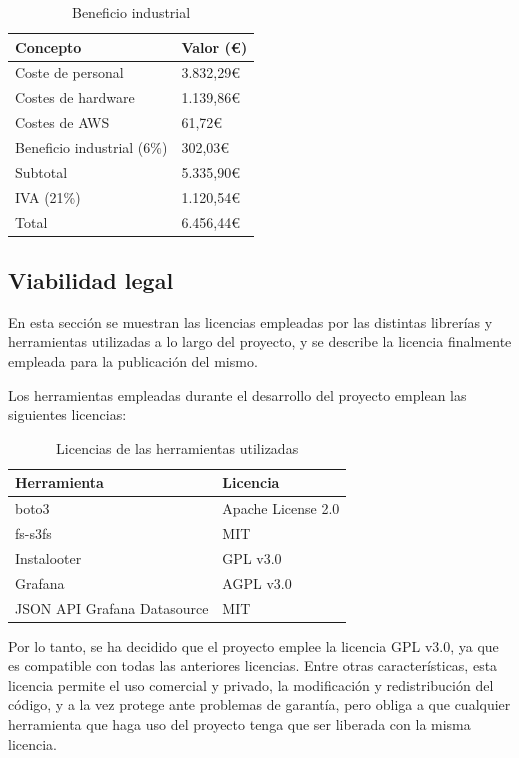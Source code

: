 \begin{table}[H]
    \centering
    \begin{tabular}{ll}
    \hline
    \textbf{Concepto}           & \textbf{Valor (€)} \\ \hline
    Coste de personal           & 3.832,29€      \\
    Costes de hardware          & 1.139,86€ \\
    Costes de AWS               & 61,72€ \\ \hline
    Beneficio industrial (6\%)  & 302,03€ \\ \hline
    Subtotal                    & 5.335,90€ \\
    IVA (21\%)                  & 1.120,54€ \\ \hline
    Total                       & 6.456,44€ \\ \hline
    \end{tabular}
    \caption{Beneficio industrial}
    \label{tab:beneficio_industrial}
\end{table}

\subsection{Viabilidad legal}

En esta sección se muestran las licencias empleadas por las distintas librerías y herramientas utilizadas a lo largo del proyecto, y se describe la licencia finalmente empleada para la publicación del mismo.

Los herramientas empleadas durante el desarrollo del proyecto emplean las siguientes licencias:

\begin{table}[H]
    \centering
    \begin{tabular}{ll}
    \hline
    \textbf{Herramienta} & \textbf{Licencia} \\ \hline
    boto3 & Apache License 2.0 \\
    fs-s3fs & MIT \\
    Instalooter & GPL v3.0 \\
    Grafana & AGPL v3.0 \\
    JSON API Grafana Datasource & MIT \\ \hline
    \end{tabular}
    \caption{Licencias de las herramientas utilizadas}
    \label{tab:licencias}
\end{table}

Por lo tanto, se ha decidido que el proyecto emplee la licencia GPL v3.0, ya que es compatible con todas las anteriores licencias. Entre otras características, esta licencia permite el uso comercial y privado, la modificación y redistribución del código, y a la vez protege ante problemas de garantía, pero obliga a que cualquier herramienta que haga uso del proyecto tenga que ser liberada con la misma licencia.
